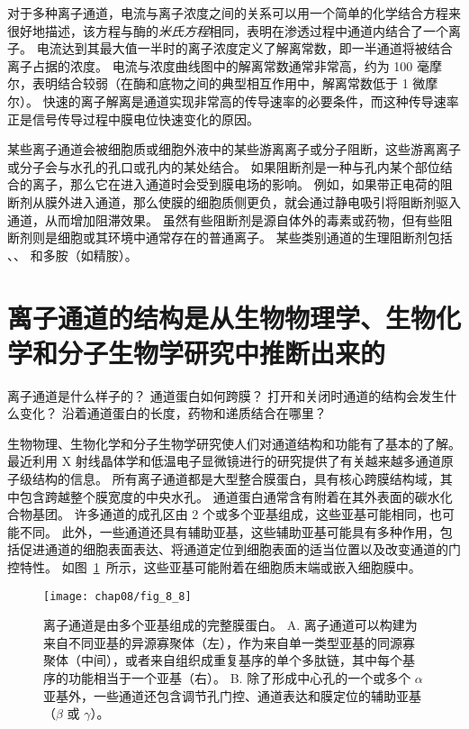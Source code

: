 对于多种离子通道，电流与离子浓度之间的关系可以用一个简单的化学结合方程来很好地描述，该方程与酶的\textit{米氏方程}相同，表明在渗透过程中通道内结合了一个离子。
电流达到其最大值一半时的离子浓度定义了解离常数，即一半通道将被结合离子占据的浓度。
电流与浓度曲线图中的解离常数通常非常高，约为 100 毫摩尔，表明结合较弱（在酶和底物之间的典型相互作用中，解离常数低于 1 微摩尔）。
快速的离子解离是通道实现非常高的传导速率的必要条件，而这种传导速率正是信号传导过程中膜电位快速变化的原因。


某些离子通道会被细胞质或细胞外液中的某些游离离子或分子阻断，这些游离离子或分子会与水孔的孔口或孔内的某处结合。
如果阻断剂是一种与孔内某个部位结合的离子，那么它在进入通道时会受到膜电场的影响。
例如，如果带正电荷的阻断剂从膜外进入通道，那么使膜的细胞质侧更负，就会通过静电吸引将阻断剂驱入通道，从而增加阻滞效果。
虽然有些阻断剂是源自体外的毒素或药物，但有些阻断剂则是细胞或其环境中通常存在的普通离子。
某些类别通道的生理阻断剂包括 、、 和多胺（如精胺）。



\section{离子通道的结构是从生物物理学、生物化学和分子生物学研究中推断出来的}

离子通道是什么样子的？
通道蛋白如何跨膜？
打开和关闭时通道的结构会发生什么变化？
沿着通道蛋白的长度，药物和递质结合在哪里？


生物物理、生物化学和分子生物学研究使人们对通道结构和功能有了基本的了解。
最近利用 X 射线晶体学和低温电子显微镜进行的研究提供了有关越来越多通道原子级结构的信息。
所有离子通道都是大型整合膜蛋白，具有核心跨膜结构域，其中包含跨越整个膜宽度的中央水孔。
通道蛋白通常含有附着在其外表面的碳水化合物基团。 许多通道的成孔区由 2 个或多个亚基组成，这些亚基可能相同，也可能不同。
此外，一些通道还具有辅助亚基，这些辅助亚基可能具有多种作用，包括促进通道的细胞表面表达、将通道定位到细胞表面的适当位置以及改变通道的门控特性。
如图~\ref{fig:8_8}~所示，这些亚基可能附着在细胞质末端或嵌入细胞膜中。


\begin{figure}[htbp]
	\centering
	\texttt{[image: chap08/fig\_8\_8]}
	\caption{离子通道是由多个亚基组成的完整膜蛋白。
		A. 离子通道可以构建为来自不同亚基的异源寡聚体（左），作为来自单一类型亚基的同源寡聚体（中间），或者来自组织成重复基序的单个多肽链，其中每个基序的功能相当于一个亚基（右）。
		B. 除了形成中心孔的一个或多个 $\alpha$ 亚基外，一些通道还包含调节孔门控、通道表达和膜定位的辅助亚基（$\beta$ 或 $\gamma$）。}
	\label{fig:8_8}
\end{figure}


